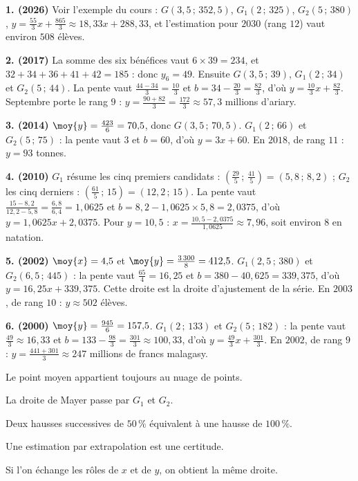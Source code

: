 \begin{corrige}[annales]
\textbf{1. (2026)} Voir l'exemple du cours : $G(3{,}5\,;\,352{,}5)$,
$G_{1}(2\,;\,325)$, $G_{2}(5\,;\,380)$,
$y = \frac{55}{3}x+\frac{865}{3} \approx 18{,}33x+288{,}33$, et
l'estimation pour $2030$ (rang $12$) vaut environ $508$ élèves.

\textbf{2. (2017)} La somme des six bénéfices vaut $6\times39 = 234$, et
$32+34+36+41+42 = 185$ : donc $y_{6} = 49$. Ensuite
$G(3{,}5\,;\,39)$, $G_{1}\left(2\,;\,34\right)$ et
$G_{2}\left(5\,;\,44\right)$. La pente vaut $\frac{44-34}{3} = \frac{10}{3}$
et $b = 34-\frac{20}{3} = \frac{82}{3}$, d'où
$y = \frac{10}{3}x+\frac{82}{3}$. Septembre porte le rang $9$ :
$y = \frac{90+82}{3} = \frac{172}{3} \approx 57{,}3$ millions d'ariary.

\textbf{3. (2014)} $\moy{y} = \frac{423}{6} = 70{,}5$, donc
$G(3{,}5\,;\,70{,}5)$. $G_{1}(2\,;\,66)$ et $G_{2}(5\,;\,75)$ : la pente
vaut $3$ et $b = 60$, d'où $y = 3x+60$. En $2018$, de rang $11$ :
$y = 93$ tonnes.

\textbf{4. (2010)} $G_{1}$ résume les cinq premiers candidats :
$\left(\frac{29}{5}\,;\,\frac{41}{5}\right) = (5{,}8\,;\,8{,}2)$ ; $G_{2}$
les cinq derniers : $\left(\frac{61}{5}\,;\,15\right) = (12{,}2\,;\,15)$.
La pente vaut $\frac{15-8{,}2}{12{,}2-5{,}8} = \frac{6{,}8}{6{,}4}
= 1{,}0625$ et $b = 8{,}2-1{,}0625\times5{,}8 = 2{,}0375$, d'où
$y = 1{,}0625x+2{,}0375$. Pour $y = 10{,}5$ :
$x = \frac{10{,}5-2{,}0375}{1{,}0625} \approx 7{,}96$, soit environ $8$ en
natation.

\textbf{5. (2002)} $\moy{x} = 4{,}5$ et
$\moy{y} = \frac{3\,300}{8} = 412{,}5$. $G_{1}(2{,}5\,;\,380)$ et
$G_{2}(6{,}5\,;\,445)$ : la pente vaut $\frac{65}{4} = 16{,}25$ et
$b = 380-40{,}625 = 339{,}375$, d'où $y = 16{,}25x+339{,}375$. Cette droite
est la droite d'ajustement de la série. En $2003$, de rang $10$ :
$y \approx 502$ élèves.

\textbf{6. (2000)} $\moy{y} = \frac{945}{6} = 157{,}5$.
$G_{1}(2\,;\,133)$ et $G_{2}(5\,;\,182)$ : la pente vaut
$\frac{49}{3} \approx 16{,}33$ et
$b = 133-\frac{98}{3} = \frac{301}{3} \approx 100{,}33$, d'où
$y = \frac{49}{3}x+\frac{301}{3}$. En $2002$, de rang $9$ :
$y = \frac{441+301}{3} \approx 247$ millions de francs malagasy.
\end{corrige}

\begin{vraifaux}
\exo Le point moyen appartient toujours au nuage de points.

\exo La droite de Mayer passe par $G_{1}$ et $G_{2}$.

\exo Deux hausses successives de $50\,\%$ équivalent à une hausse de
$100\,\%$.

\exo Une estimation par extrapolation est une certitude.

\exo Si l'on échange les rôles de $x$ et de $y$, on obtient la même droite.
\end{vraifaux}

